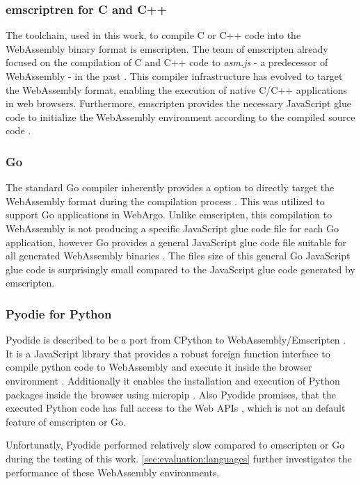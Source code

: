 \subsubsection{emscriptren for C and C++}
\label{subsec:methodology:wasm:cpp}
The toolchain, used in this work, to compile C or C++ code into the WebAssembly binary format is emscripten. The team of emscripten already focused on the compilation of C and C++ code to \emph{asm.js} - a predecessor of WebAssembly - in the past \cite{methodology:emcc}. This compiler infrastructure has evolved to target the WebAssembly format, enabling the execution of native C/C++ applications in web browsers. Furthermore, emscripten provides the necessary JavaScript glue code to initialize the WebAssembly environment according to the compiled source code \cite{methodology:emcc}.

\subsubsection{Go}
\label{subsec:methodology:wasm:go}
The standard Go compiler inherently provides a option to directly target the WebAssembly format during the compilation process \cite{methodology:go}. This was utilized to support Go applications in WebArgo. Unlike emscripten, this compilation to WebAssembly is not producing a specific JavaScript glue code file for each Go application, however Go provides a general JavaScript glue code file suitable for all generated WebAssembly binaries \cite{methodology:go}. The files size of this general Go JavaScript glue code is surprisingly small compared to the JavaScript glue code generated by emscripten.

\subsubsection{Pyodie for Python}
\label{subsec:methodology:wasm:python}
Pyodide is described to be a port from CPython to WebAssembly/Emscripten \cite{methodology:pyodie}. It is a JavaScript library that provides a robust foreign function interface to compile python code to WebAssembly and execute it inside the browser environment \cite{methodology:pyodie}. Additionally it enables the installation and execution of Python packages inside the browser using micropip \cite{methodology:pyodie}. Also Pyodide promises, that the executed Python code has full access to the Web \ac{API}s \cite{methodology:pyodie}, which is not an default feature of emscripten or Go.

Unfortunatly, Pyodide performed relatively slow compared to emscripten or Go during the testing of this work. \autoref{sec:evaluation:languages} further investigates the performance of these WebAssembly environments. 

